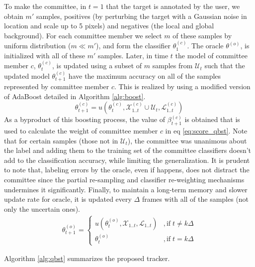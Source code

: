 \documentclass[10pt, conference, compsocconf]{IEEEtran}
\begin{document}
To make the committee, in $t=1$ that the target is annotated by the user, we obtain $m'$ samples, positives (by perturbing the target with a Gaussian noise in location and scale up to 5 pixels) and negatives (the local and global background). For each committee member we select $m$ of these samples by uniform distribution ($ m \ll m'$), and form the classifier $\theta_1^{(c)}$. The oracle $\theta^{(o)}$, is initialized with all of these $m'$ samples. Later, in time $t$ the model of committee member $c$, $\theta_t^{(c)}$, is updated using a subset of $m$ samples from $\mathcal{U}_t$ such that the updated model $\theta_{t+1}^{(c)}$ have the maximum accuracy on all of the samples represented by committee member $c$. This is realized by using a modified version of AdaBoost detailed in Algorithm \eqref{alg:boost}.
\begin{equation}
\theta^{(c)}_{t+1} = u(\theta^{(c)}_t, \mathcal{X}^{(c)}_{1..t} \cup \mathcal{U}_t, \mathcal{L}^{(c)}_{1..t})
\end{equation}
As a byproduct of this boosting process, the value of $\beta_{t+1}^{(c)}$ is obtained that is used to calculate the weight of committee member $c$ in eq \eqref{eq:score_qbst}. Note that for certain samples (those not in $\mathcal{U}_t$), the committee was unanimous about the label and adding them to the training set of the committee classifiers doesn't add to the classification accuracy, while limiting the generalization. It is prudent to note that, labeling errors by the oracle, even if happens, does not distract the committee since the partial re-sampling and classifier re-weighting mechanisms undermines it significantly.
Finally, to maintain a long-term memory and slower update rate for oracle, it is updated every $\Delta$ frames with all of the samples (not only the uncertain ones).
\begin{align}
\theta^{(o)}_{t+1} = 
    \begin{cases}
    u(\theta^{(o)}_t, \mathcal{X}_{1..t}, \mathcal{L}_{1..t})     &, \mathrm{if} \; t \neq k\Delta \\
    \theta^{(o)}_{t}                                             &, \mathrm{if} \; t = k\Delta
    \end{cases}
\label{eq:update_qbst}
\end{align}

Algorithm \eqref{alg:qbst} summarizes the proposed tracker.
\end{document}
